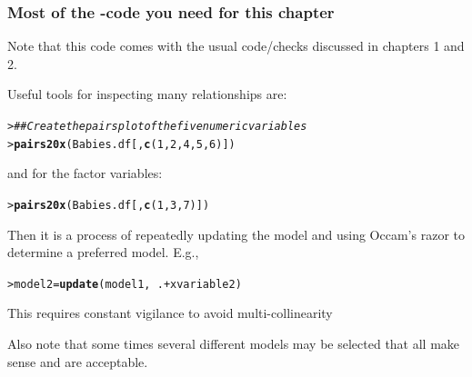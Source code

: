 \documentclass{beamer}\usepackage[]{graphicx}\usepackage[]{xcolor}
\makeatletter
\newcommand{\hlnum}[1]{\textcolor[rgb]{0.686,0.059,0.569}{#1}}%
\newcommand{\hlcom}[1]{\textcolor[rgb]{0.678,0.584,0.686}{\textit{#1}}}%
\newcommand{\hlopt}[1]{\textcolor[rgb]{0,0,0}{#1}}%
\newcommand{\hlstd}[1]{\textcolor[rgb]{0.345,0.345,0.345}{#1}}%
\newcommand{\hlkwb}[1]{\textcolor[rgb]{0.69,0.353,0.396}{#1}}%
\newcommand{\hlkwd}[1]{\textcolor[rgb]{0.737,0.353,0.396}{\textbf{#1}}}%
\newenvironment{kframe}{%
 \def\at@end@of@kframe{}%
 \ifinner\ifhmode%
  \def\at@end@of@kframe{\end{minipage}}%
  \begin{minipage}{\columnwidth}%
 \fi\fi%
 \def\FrameCommand##1{\hskip\@totalleftmargin \hskip-\fboxsep
 \colorbox{shadecolor}{##1}\hskip-\fboxsep
     \hskip-\linewidth \hskip-\@totalleftmargin \hskip\columnwidth}%
 \MakeFramed {\advance\hsize-\width
   \@totalleftmargin\z@ \linewidth\hsize
   \@setminipage}}%
 {\par\unskip\endMakeFramed%
 \at@end@of@kframe}
\newenvironment{knitrout}{}{} %
\makeatother
\begin{document}
\begin{frame}[fragile]
\frametitle{Most of the -code you need for this chapter}

Note that this code comes with the usual code/checks discussed in chapters 1 and 2.
\medskip

Useful tools for inspecting many relationships are:

\begin{knitrout}\scriptsize
{}\color{fgcolor}\begin{kframe}
\begin{alltt}
\hlstd{> }\hlcom{## Create the pairs plot of the five numeric variables}
\hlstd{> }\hlkwd{pairs20x}\hlstd{(Babies.df[,}\hlkwd{c}\hlstd{(}\hlnum{1}\hlstd{,}\hlnum{2}\hlstd{,}\hlnum{4}\hlstd{,}\hlnum{5}\hlstd{,}\hlnum{6}\hlstd{)])}
\end{alltt}
\end{kframe}
\end{knitrout}

and for the factor variables:

\begin{knitrout}\scriptsize
{}\color{fgcolor}\begin{kframe}
\begin{alltt}
\hlstd{> }\hlkwd{pairs20x}\hlstd{(Babies.df[,}\hlkwd{c}\hlstd{(}\hlnum{1}\hlstd{,}\hlnum{3}\hlstd{,}\hlnum{7}\hlstd{)])}
\end{alltt}
\end{kframe}
\end{knitrout}
\medskip

Then it is a process of repeatedly updating the model and using Occam's razor to determine a preferred model. E.g.,
\begin{knitrout}\scriptsize
{}\color{fgcolor}\begin{kframe}
\begin{alltt}
\hlstd{> }\hlstd{model2}\hlkwb{=}\hlkwd{update}\hlstd{(model1,} \hlopt{~}\hlstd{.} \hlopt{+} \hlstd{xvariable2)}
\end{alltt}
\end{kframe}
\end{knitrout}

This requires constant vigilance to avoid multi-collinearity
\bigskip

Also note that some times several different models may be selected that all make sense and are acceptable.  
\end{frame}
\end{document}

